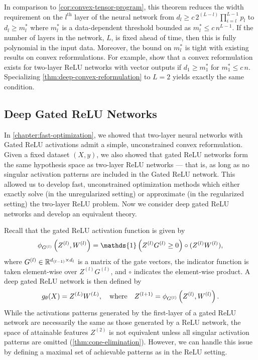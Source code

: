 In comparison to \cref{cor:convex-tensor-program}, this theorem reduces
the width requirement on the \( l^{\text{th}} \) layer of the neural network
from \( d_l \geq c \, 2^{(L- l)} \prod_{i=l}^{L-1} p_l \) to
\( d_l \geq m^*_{l} \) where \( m^*_{l} \) is a data-dependent threshold
bounded as \( m^*_{l} \leq c \, n^{L - 1} \).
If the number of layers in the network, \( L \), is fixed ahead of time, then
this is fully polynomial in the input data.
Moreover, the bound on \( m^*_l \) is tight with existing results on
convex reformulations.
For example, \citep{sahiner2021vector} show that a convex reformulation exists
for two-layer ReLU networks with vector outputs if \( d_1 \geq m_1^* \) for
\( m_1^* \leq c \, n \).
Specializing \cref{thm:deep-convex-reformulation} to \( L = 2 \) yields exactly
the same condition.

\subsection{Deep Gated ReLU Networks}\label{sec:deep-gated-relu}

In \cref{chapter:fast-optimization}, we showed that two-layer neural networks
with Gated ReLU activations admit a simple, unconstrained convex
reformulation.
Given a fixed dataset \( (X, y) \), we also showed that gated ReLU networks
form the same hypothesis space as two-layer ReLU networks --- that is, as long
as no singular activation patterns are included in the Gated ReLU network.
This allowed us to develop fast, unconstrained optimization methods
which either exactly solve (in the unregularized setting) or approximate
(in the regularized setting) the two-layer ReLU problem.
Now we consider deep gated ReLU networks and develop an equivalent theory.

Recall that the gated ReLU activation function is given by
\[
    \phi_{G^{(l)}}\rbr{Z^{(l)}, W^{(l)}}
    = \mathds{1}\rbr{Z^{(l)} G^{(l)} \geq 0} \circ (Z^{(l)} W^{(l)}),
\]
where \( G^{(l)} \in \mathbb{R}^{d_{(l-1)} \times d_{l}} \) is a matrix of the gate
vectors, the indicator function is taken element-wise over
\( Z^{(l)} G^{(l)} \), and \( \circ \) indicates the element-wise product.
A deep gated ReLU network is then defined by
\begin{equation}\label{eq:deep-gated-relu}
    g_\theta(X) = Z^{(L)} W^{(L)},
    \quad \text{where} \quad
    Z^{(l+1)} = \phi_{G^{(l)}}\left(Z^{(l)}, W^{(l)}\right).
\end{equation}
While the activations patterns generated by the first-layer of a gated
ReLU network are necessarily the same as those generated by a ReLU network, the
space of attainable features \( Z^{(2)} \) is not equivalent unless all
singular activation patterns are omitted (\cref{thm:cone-elimination}).
However, we can handle this issue by defining a maximal set of achievable
patterns as in the ReLU setting.

